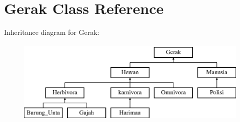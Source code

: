 \hypertarget{class_gerak}{}\section{Gerak Class Reference}
\label{class_gerak}
Inheritance diagram for Gerak\+:\begin{figure}[H]
\begin{center}
\leavevmode
\includegraphics[height=4.000000cm]{class_gerak}
\end{center}
\end{figure}
